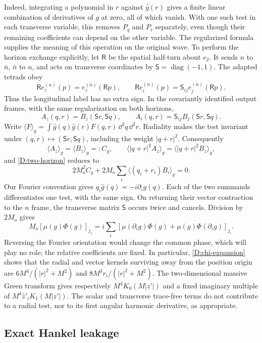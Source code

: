 Indeed, integrating a polynomial in $r$ against $\widehat g(r)$
gives a finite linear combination of derivatives of $g$ at zero,
all of which vanish.  With one such test in each transverse variable,
this removes $P_q$ and $P_r$ separately, even though their remaining
coefficients can depend on the other variable.  The regularized
formula supplies the meaning of this operation on the original wave.
To perform the horizon exchange explicitly, let $\mathsf R$ be the spatial
half-turn about $e_2$. It sends $n$ to $\bar n$, $\bar n$ to $n$, and acts
on transverse coordinates by $\mathsf S=\operatorname{diag}(-1,1)$.
The adapted tetrads obey
\[
 \mathsf R e_z^{(n)}(p)=e_z^{(\bar n)}(\mathsf Rp),\qquad
 \mathsf R e_i^{(n)}(p)=\mathsf S_{ij}e_j^{(\bar n)}(\mathsf Rp).
\]
Thus the longitudinal label has no extra sign. In the covariantly
identified output frames, with the same regularization on both horizons,
\[
 A_z(q,r)=B_z(\mathsf Sr,\mathsf Sq),\qquad
 A_i(q,r)=\mathsf S_{ij}B_j(\mathsf Sr,\mathsf Sq).
\]
Write $\langle F\rangle_g=\int\widehat g(q)\widehat g(r)F(q,r)
\,\dd^2q\,\dd^2r$. Radiality makes the test invariant under
$(q,r)\mapsto(\mathsf Sr,\mathsf Sq)$, including the weight
$|q+r|^2$. Consequently
\[
 \langle A_z\rangle_g=\langle B_z\rangle_g=:C_g,\qquad
 \langle |q+r|^2A_z\rangle_g=\langle |q+r|^2B_z\rangle_g,
\]
and \eqref{D:two-horizon} reduces to
\[
 2M_o^2C_g+2M_o\sum_i\langle(q_i+r_i)B_i\rangle_g=0.
\]
Our Fourier convention gives
$q_i\widehat g(q)=-i\widehat{\partial_i g}(q)$. Each of the two
summands differentiates one test, with the same sign. On returning
their vector contraction to the $n$ frame, the transverse matrix
$\mathsf S$ occurs twice and cancels. Division by $2M_o$ gives
\begin{equation}\label{D:radial-identity}
 M_o[\mu(g)\Phi(g)]_{j_z}
 =i\sum_i
 [\mu(\partial_i g)\Phi(g)+\mu(g)\Phi(\partial_i g)]_{j_i}.
\end{equation}
Reversing the Fourier orientation would change the common phase,
which will play no role; the relative coefficients are fixed.
In particular, \eqref{D:chi-expansion} shows that the radial and
vector kernels surviving away from the position origin are
$6M^4/(|r|^2+M^2)$ and $8M^3r_i/(|r|^2+M^2)$.
The two-dimensional massive Green transform gives respectively
$M^4K_0(M|z'|)$ and a fixed imaginary multiple of
$M^4\widehat z'_iK_1(M|z'|)$.  The scalar and transverse trace-free
terms do not contribute to a radial test, nor to its first angular
harmonic derivative, as appropriate.

\subsection{Exact Hankel leakage}


